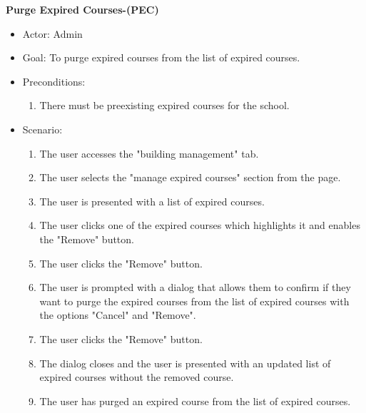 \documentclass[letterpaper,12pt,oneside,listof=totoc]{scrreprt}
\begin{document}
\hfill \break
\textbf{Purge Expired Courses-(PEC)}
\begin{itemize}
    \item Actor: Admin
    \item Goal: To purge expired courses from the list of expired courses.
    \item Preconditions: 
    \begin{enumerate}
        \item There must be preexisting expired courses for the school.
    \end{enumerate}
    \item Scenario:
    \begin{enumerate}
        \item The user accesses the "building management" tab.
        \item The user selects the "manage expired courses" section from the page.
        \item The user is presented with a list of expired courses.
        \item The user clicks one of the expired courses which highlights it and enables the "Remove" button.
        \item The user clicks the "Remove" button.
        \item The user is prompted with a dialog that allows them to confirm if they want to purge the expired courses from the list of expired courses with the options "Cancel" and "Remove".
        \item The user clicks the "Remove" button.
        \item The dialog closes and the user is presented with an updated list of expired courses without the removed course.
        \item The user has purged an expired course from the list of expired courses.
    \end{enumerate}
\end{itemize}
\end{document}
